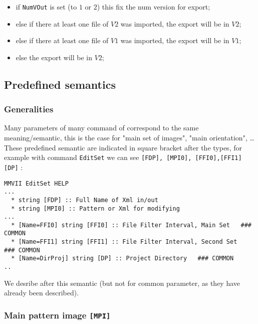 \begin{itemize}
    \item if {\tt NumVOut} is set (to $1$ or $2$) this fix the num version for export;
    \item else if there at least one file of $V2$ was imported, the export will be in $V2$;
    \item else if there at least one file of $V1$ was imported, the export will be in $V1$;
    \item else  the export will be in $V2$;
\end{itemize}


\subsection{Predefined semantics}

\label{Param:Pred:Sem}


\subsubsection{Generalities}

Many parameters of many command of \PPP correspond to the same meaning/semantic,
this is  the case for "main set of images", "main orientation", \dots These predefined
semantic are indicated in square bracket after the types, for example with command
{\tt EditSet} we can see {\tt [FDP], [MPI0], [FFI0],[FFI1] [DP]} :


\begin{verbatim}
MMVII EditSet HELP
...
  * string [FDP] :: Full Name of Xml in/out
  * string [MPI0] :: Pattern or Xml for modifying
...
  * [Name=FFI0] string [FFI0] :: File Filter Interval, Main Set   ### COMMON 
  * [Name=FFI1] string [FFI1] :: File Filter Interval, Second Set   ### COMMON 
  * [Name=DirProj] string [DP] :: Project Directory   ### COMMON 
..
\end{verbatim}

We desribe after this semantic (but not for common parameter, as they have already been described).



\subsubsection{Main pattern image {\tt [MPI]}}

